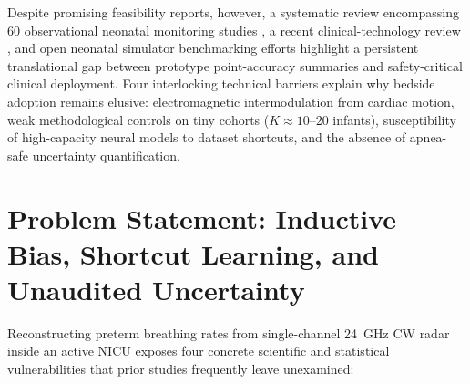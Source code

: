 Despite promising feasibility reports, however, a systematic review encompassing $60$
observational neonatal monitoring studies \citep{senechal2026next}, a recent clinical-technology
review \citep{krbec2024emerging}, and open neonatal simulator benchmarking efforts
\citep{gleichauf2024time} highlight a persistent translational gap
between prototype point-accuracy summaries and safety-critical clinical deployment. Four
interlocking technical barriers explain why bedside adoption remains elusive: electromagnetic
intermodulation from cardiac motion, weak methodological controls on tiny cohorts ($K \approx
10\text{--}20$ infants), susceptibility of high-capacity neural models to dataset shortcuts, and
the absence of apnea-safe uncertainty quantification.

\section{Problem Statement: Inductive Bias, Shortcut Learning, and Unaudited Uncertainty}
\label{sec:ch1_problem}

Reconstructing preterm breathing rates from single-channel \SI{24}{\giga\hertz} CW radar inside an
active NICU exposes four concrete scientific and statistical vulnerabilities that prior studies
frequently leave unexamined:


